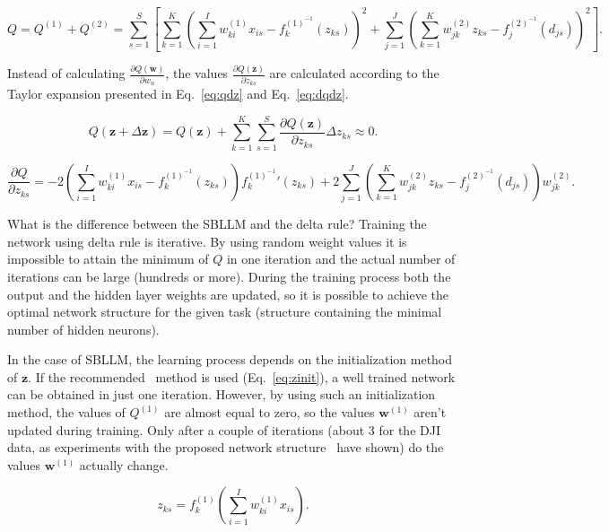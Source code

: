 \documentclass[]{spie}  %
\newcommand{\bm}[1]{\boldsymbol{#1}}
\begin{document}
\begin{equation}
Q = Q^{(1)} + Q^{(2)} = \sum_{s=1}^{S} \left[ \sum_{k=1}^{K} \left( \sum_{i=1}^{I} w^{(1)}_{ki} x_{is} - f^{(1)^{-1}}_k(z_{ks}) \right)^{2} + \sum_{j=1}^{J} \left( \sum_{k=1}^{K} w^{(2)}_{jk} z_{ks} - f^{(2)^{-1}}_j(d_{js}) \right)^{2} \right].
\label{eq:qall}
\end{equation}

\noindent Instead of calculating $\frac{\partial Q(\bm{w})}{\partial w_n}$, the values $\frac{\partial Q(\bm{z})}{\partial z_{ks}}$ are calculated according to the Taylor expansion presented in Eq.~\ref{eq:qdz} and Eq.~\ref{eq:dqdz}.

\begin{equation}
Q(\bm{z} + \Delta \bm{z}) = Q(\bm{z}) + \sum_{k=1}^{K}\sum_{s=1}^{S} \frac{\partial Q(\bm{z})}{\partial z_{ks}} \Delta z_{ks} \approx 0.
\label{eq:qdz}
\end{equation}

\begin{equation}
\frac{\partial Q}{\partial z_{ks}} = - 2 \left( \sum_{i=1}^{I} w^{(1)}_{ki} x_{is} - f^{(1)^{-1}}_k(z_{ks}) \right) {f^{(1)^{-1}}_k}'(z_{ks}) + 2 \sum_{j=1}^{J} \left( \sum_{k=1}^{K} w^{(2)}_{jk} z_{ks} - f^{(2)^{-1}}_j(d_{js}) \right) w^{(2)}_{jk}.
\label{eq:dqdz}
\end{equation}

What is the difference between the SBLLM and the delta rule? Training the network using delta rule is iterative. By using random weight values it is impossible to attain the minimum of $Q$ in one iteration and the actual number of iterations can be large (hundreds or more). During the training process both the output and the hidden layer weights are updated, so it is possible to achieve the optimal network structure for the given task (structure containing the minimal number of hidden neurons).

In the case of SBLLM, the learning process depends on the initialization method of $\bm{z}$. If the recommended~\cite{castillo2006very} method is used (Eq.~\ref{eq:zinit}), a well trained network can be obtained in just one iteration. However, by using such an initialization method, the values of $Q^{(1)}$ are almost equal to zero, so the values $\bm{w}^{(1)}$ aren't updated during training. Only after a couple of iterations (about 3 for the DJI data, as experiments with the proposed network structure~\cite{castillo2006very} have shown) do the values $\bm{w}^{(1)}$ actually change.

\begin{equation}
z_{ks} = f^{(1)}_{k} \left( \sum_{i=1}^{I} w^{(1)}_{ki} x_{is} \right).
\label{eq:zinit}
\end{equation}
\end{document}
